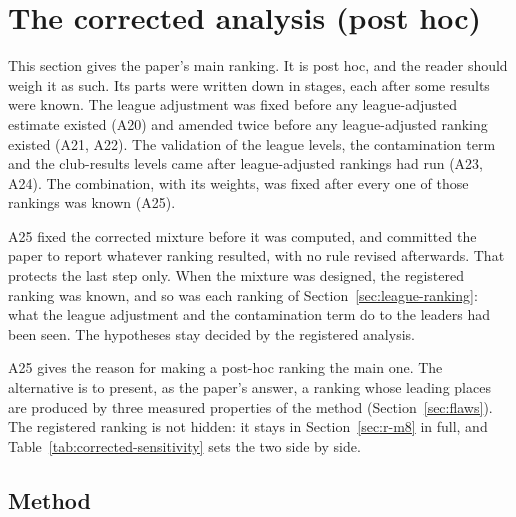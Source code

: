 \documentclass[11pt,a4paper]{article}
\begin{document}
\section{The corrected analysis (post hoc)}
\label{sec:corrected}

This section gives the paper's main ranking. It is post hoc, and the reader
should weigh it as such. Its parts were written down in stages, each after
some results were known. The league adjustment was fixed before any
league-adjusted estimate existed (A20) and amended twice before any
league-adjusted ranking existed (A21, A22). The validation of the league
levels, the contamination term and the club-results levels came after
league-adjusted rankings had run (A23, A24). The combination, with its
weights, was fixed after every one of those rankings was known (A25).

A25 fixed the corrected mixture before it was computed, and committed the
paper to report whatever ranking resulted, with no rule revised afterwards.
That protects the last step only. When the mixture was designed, the
registered ranking was known, and so was each ranking of
Section~\ref{sec:league-ranking}: what the league adjustment and the
contamination term do to the leaders had been seen. The hypotheses stay
decided by the registered analysis.

A25 gives the reason for making a post-hoc ranking the main one. The
alternative is to present, as the paper's answer, a ranking whose leading
places are produced by three measured properties of the method
(Section~\ref{sec:flaws}). The registered ranking is not hidden: it stays in
Section~\ref{sec:r-m8} in full, and Table~\ref{tab:corrected-sensitivity} sets
the two side by side.

\subsection{Method}
\label{sec:league-method}
\end{document}

